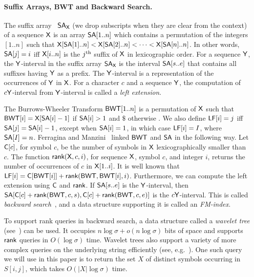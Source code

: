  
\paragraph{Suffix Arrays, BWT and Backward Search.}
The suffix array~\cite{mm1993} $\mbox{\rm {\sf SA}}_{\mathsf{X}}$ (we drop subscripts when
they are clear
from the context) of a sequence $\mathsf{X}$
is an array $\mbox{\rm {\sf SA}}[1..n]$ which
contains a permutation of the integers $[1..n]$ such that $\mathsf{X}[\mbox{\rm {\sf SA}}[1]..n]
< \mathsf{X}[\mbox{\rm {\sf SA}}[2]..n] < \cdots < \mathsf{X}[\mbox{\rm {\sf SA}}[n]..n]$.  In other words, $\mbox{\rm {\sf SA}}[j] =
i$ iff $\mathsf{X}[i..n]$ is the $j^{\mbox{{\scriptsize th}}}$ suffix of $\mathsf{X}$
in lexicographic order. For a sequence $\mathsf{Y}$, the $\mathsf{Y}$-interval in the suffix array $\mbox{\rm {\sf SA}}_{\mathsf{X}}$ is
the interval $\mbox{\rm {\sf SA}}[s..e]$ that contains all suffixes having $\mathsf{Y}$ as a
prefix. The $\mathsf{Y}$-interval is a representation of the occurrences of
$\mathsf{Y}$ in $\mathsf{X}$. For a character $c$ and a sequence $\mathsf{Y}$, the computation
of $c\mathsf{Y}$-interval from $\mathsf{Y}$-interval is called a \emph{left extension}.

The Burrows-Wheeler Transform $\mbox{\rm {\sf BWT}}[1..n]$ is a
permutation of $\mathsf{X}$ such that $\mbox{\rm {\sf BWT}}[i] = \mathsf{X}[\mbox{\rm {\sf SA}}[i]-1]$ if $\mbox{\rm {\sf SA}}[i]>1$
and $\$$ otherwise \cite{bw1994}. We also define $\mbox{\rm {\sf LF}}[i] = j$ iff $\mbox{\rm {\sf SA}}[j] =
\mbox{\rm {\sf SA}}[i]-1$, except when $\mbox{\rm {\sf SA}}[i] = 1$, in which case $\mbox{\rm {\sf LF}}[i] = I$,
where $\mbox{\rm {\sf SA}}[I] = n$.  Ferragina and Manzini~\cite{fm2005} linked $\mbox{\rm {\sf BWT}}$ and $\mbox{\rm {\sf SA}}$ in the
following way.  
Let $\mbox{\rm {\sf C}}[c]$, for symbol $c$, be the number of symbols
in $\mathsf{X}$ lexicographically smaller than $c$.  The function
$\textsf{rank}(\mathsf{X},c,i)$, for sequence $\mathsf{X}$, symbol $c$, and integer $i$, returns
the number of occurrences of $c$ in $\mathsf{X}[1..i]$.  It is well known that
$\mbox{\rm {\sf LF}}[i] = \mbox{\rm {\sf C}}[\mbox{\rm {\sf BWT}}[i]] + \textsf{rank}(\mbox{\rm {\sf BWT}},\mbox{\rm {\sf BWT}}[i],i)$.  Furthermore, we can
compute the left extension using $\mbox{\rm {\sf C}}$ and $\textsf{rank}$.  If $\mbox{\rm {\sf SA}}[s..e]$ is
the $\mathsf{Y}$-interval,
then
$\mbox{\rm {\sf SA}}[\mbox{\rm {\sf C}}[c]+\textsf{rank}(\mbox{\rm {\sf BWT}},c,s),\mbox{\rm {\sf C}}[c]+\textsf{rank}(\mbox{\rm {\sf BWT}},c,e)]$ is
the $c\mathsf{Y}$-interval.
This is called \emph{backward search}~\cite{fm2005}, and a data
structure supporting it is called an {\em FM-index}.

To support rank queries in backward search, a data structure called a {\em wavelet tree} (see~\cite{GNPtcs11}) 
can be used. It occupies $n\log\sigma + o(n\log\sigma)$
bits of space and supports $\textsf{rank}$ queries in $O(\log\sigma)$ time.
Wavelet trees also support a variety of more complex queries on the underlying string  efficiently (see, e.g.~\cite{GNPtcs11}). 
One such query we will use in this paper 
is to return the set $X$ of 
distinct symbols occurring in $S[i,j]$, which takes
$O(|X|\log\sigma)$ time.

